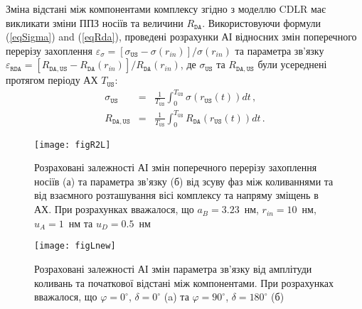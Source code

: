 Зміна відстані між компонентами комплексу згідно з моделлю CDLR має викликати зміни
ППЗ носіїв та величини $R_\mathtt{DA}$.
Використовуючи формули (\ref{eqSigma}) and (\ref{eqRda}), проведені розрахунки
АІ відносних змін поперечного перерізу захоплення
$\varepsilon_\sigma=[\sigma_{\mathtt{US}}-\sigma(r_{in})]/\sigma(r_{in})$
та параметра зв'язку
$\varepsilon_{\mathtt{RDA}}=[R_{\mathtt{DA,US}}-R_\mathtt{DA}(r_{in})]/R_\mathtt{DA}(r_{in})$,
де $\sigma_{\mathtt{US}}$ та $R_{\mathtt{DA,US}}$ були усереднені протягом періоду АХ $T_\mathtt{US}$:
\begin{eqnarray}
  \label{eqAverSigma} \sigma_{\mathtt{US}}&=&\frac{1}{T_\mathtt{US}}\int^{T_\mathtt{US}}_0\!\!\!\!\!\!\sigma(r_\mathtt{US}(t))dt\,, \\
  \label{eqAverRda} R_{\mathtt{DA,US}}&=&\frac{1}{T_\mathtt{US}}\int^{T_\mathtt{US}}_0\!\!\!\!\!\!R_{\mathtt{DA}}(r_\mathtt{US}(t))dt\,.
\end{eqnarray}



\begin{figure}
\center
\texttt{[image: figR2L]}
\caption{\label{figR2L}
Розраховані залежності  АІ змін поперечного перерізу захоплення носіїв (а) та параметра зв'язку (б) від зсуву фаз між коливаннями та від взаємного
розташування вісі комплексу та напряму зміщень в АХ.
При розрахунках вважалося, що $a_B=3.23$~нм, $r_{in}=10$~нм, $u_A=1$~нм та $u_D=0.5$~нм
}%
\end{figure}

\begin{figure}
\center
\texttt{[image: figLnew]}
\caption{\label{figLnew}
Розраховані залежності  АІ змін параметра зв'язку від амплітуди коливань та початкової відстані між компонентами.
При розрахунках вважалося, що $\varphi=0^\circ$, $\delta=0^\circ$ (a) та $\varphi=90^\circ$, $\delta=180^\circ$ (б)
}%
\end{figure}

